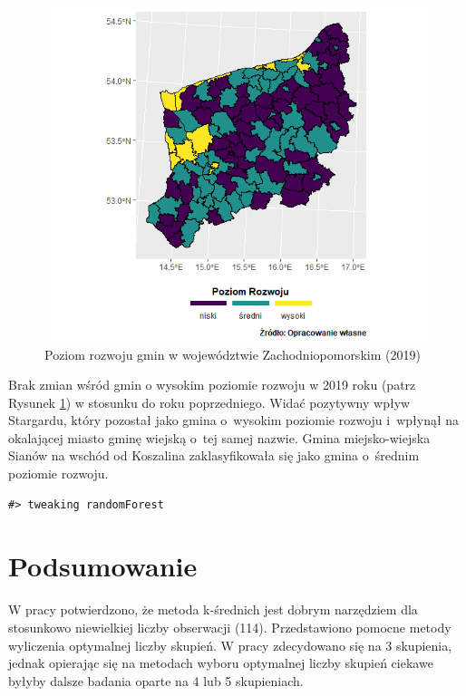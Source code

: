 \documentclass{amuthesis}
\begin{document}
\begin{figure}[t]

{\centering \includegraphics[width=1\linewidth]{figures/mapa_2019_bez} 

}

\caption{Poziom rozwoju gmin w województwie Zachodniopomorskim (2019)}\label{fig:rycina9}
\end{figure}

Brak zmian wśród gmin o wysokim poziomie rozwoju w 2019 roku (patrz Rysunek \ref{fig:rycina9}) w stosunku do roku poprzedniego. Widać pozytywny wpływ Stargardu, który pozostał jako gmina o~wysokim poziomie rozwoju i~wpłynął na okalającej miasto gminę wiejską o~tej samej nazwie.
Gmina miejsko-wiejska Sianów na wschód od Koszalina zaklasyfikowała się jako gmina o~średnim poziomie rozwoju.

\begin{verbatim}
#> tweaking randomForest
\end{verbatim}

\hypertarget{podsumowanie1}{%
\chapter{Podsumowanie}\label{podsumowanie1}}

W pracy potwierdzono, że metoda k-średnich jest dobrym narzędziem dla stosunkowo niewielkiej liczby obserwacji (114).
Przedstawiono pomocne metody wyliczenia optymalnej liczby skupień.
W pracy zdecydowano się na 3 skupienia, jednak opierając się na metodach wyboru optymalnej liczby skupień ciekawe byłyby dalsze badania oparte na 4 lub 5 skupieniach.
\end{document}
